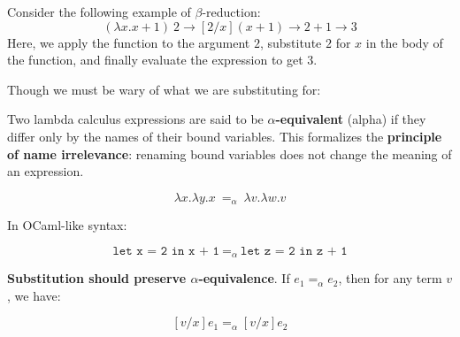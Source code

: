 \begin{Example}

    \noindent
    Consider the following example of $\beta$-reduction:
    \[
    (\lambda x. x + 1)\ 2 \rightarrow [2/x](x + 1) \rightarrow 2 + 1 \rightarrow 3
    \]
    \noindent
    Here, we apply the function to the argument \(2\), substitute \(2\) for \(x\) in the body of the function, and finally evaluate the expression to get \(3\).
\end{Example}

\newpage
\noindent
Though we must be wary of what we are substituting for:
\begin{Def}

    Two lambda calculus expressions are said to be \textbf{$\alpha$-equivalent} (alpha) if they differ only by the names of their bound variables. 
    This formalizes the \textbf{principle of name irrelevance}: renaming bound variables does not change the meaning of an expression.
    
    \[
    \lambda x. \lambda y. x \ =_\alpha\ \lambda v. \lambda w. v
    \]
    
    \noindent
    In OCaml-like syntax:
    
    \[
    \texttt{let x = 2 in x + 1} \ =_\alpha\ \texttt{let z = 2 in z + 1}
    \]
    
    \noindent
    \textbf{Substitution should preserve $\alpha$-equivalence}. If \( e_1 =_\alpha e_2 \), then for any term \( v \), we have:
    
    \[
    [v/x]e_1 =_\alpha [v/x]e_2
    \]
    
    \end{Def}



